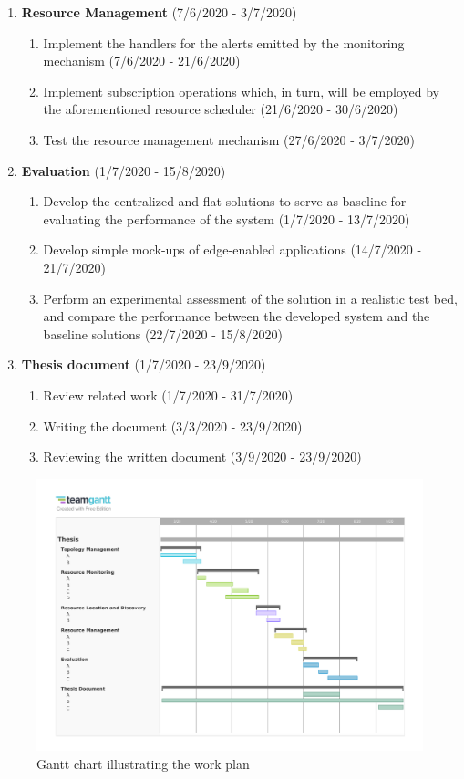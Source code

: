 \begin{enumerate}
    \item \textbf{Resource Management} (7/6/2020 - 3/7/2020)
    
    \begin{enumerate}
        \item Implement the handlers for the alerts emitted by the monitoring mechanism (7/6/2020 - 21/6/2020)
        \item Implement subscription operations which, in turn, will be employed by the aforementioned resource scheduler (21/6/2020 - 30/6/2020)
        \item Test the resource management mechanism (27/6/2020 - 3/7/2020)
    \end{enumerate}

    \item \textbf{Evaluation} (1/7/2020 - 15/8/2020)
    
    \begin{enumerate}
        \item Develop the centralized and flat solutions to serve as baseline for evaluating the performance of the system (1/7/2020 - 13/7/2020)
        \item Develop simple mock-ups of edge-enabled applications (14/7/2020 - 21/7/2020)
        \item Perform an experimental assessment of the solution in a realistic test bed, and compare the performance between the developed system and the baseline solutions (22/7/2020 - 15/8/2020)
    \end{enumerate}

    \item \textbf{Thesis document} (1/7/2020 - 23/9/2020)
    
    \begin{enumerate}
        \item Review related work (1/7/2020 - 31/7/2020)
        \item Writing the document (3/3/2020 - 23/9/2020)
        \item Reviewing the written document (3/9/2020 - 23/9/2020)
    \end{enumerate}
    
\end{enumerate}


\begin{figure}[hbpt]
    \centering
    \includegraphics[width=0.95\linewidth]{Figures/gantt_chart.pdf}
    \caption{Gantt chart illustrating the work plan}
    \label{fig:gantt_chart}
\end{figure}
